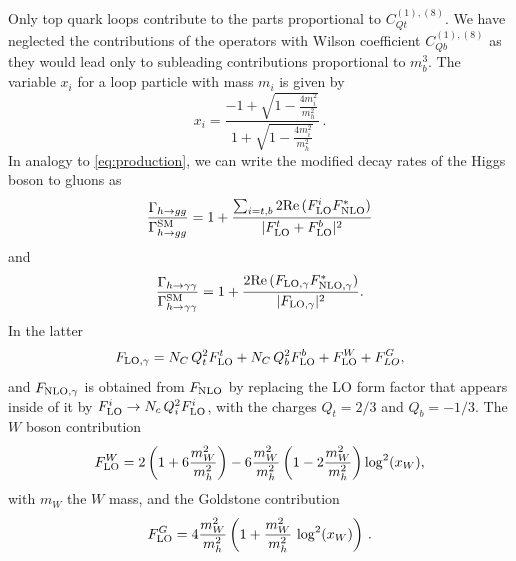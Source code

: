Only top quark loops contribute to the parts proportional to $C_{Qt}^{(1),(8)}$. We have neglected the contributions of the operators with Wilson coefficient $C_{Qb}^{(1),(8)}$ as they would lead only to subleading contributions proportional to $m_b^3$.
%
The variable $x_i$ for a loop particle with mass $m_i$ is given by
\begin{equation}
	x_i=\frac{-1+\sqrt{1-\frac{4 m_i^2}{m_h^2}}}{1+\sqrt{1-\frac{4 m_i^2}{m_h^2}}}\,. \label{eq:xvariable}
\end{equation} 
In analogy to \eqref{eq:production}, we can write the modified decay rates of the Higgs boson to gluons as
\begin{equation}
	\frac{\Gamma_{h\to gg}}{\Gamma_{h\to gg}^{\mathrm{SM}}}= 1+ \frac{ \sum_{i=t,b} 2 \mbox{Re}\,(F_{\textrm{LO}}^i F^*_{\textrm{NLO}})}{ |F_{\textrm{LO}}^t+F_{\textrm{LO}}^b|^2} 
\end{equation}
and 
\begin{equation}
	\frac{\Gamma_{h\to \gamma\gamma}}{\Gamma_{h\to \gamma\gamma}^{\mathrm{SM}}}= 1+ \frac{2 \mbox{Re}\,(F_{\textrm{LO}, \gamma} F^*_{\textrm{NLO},\gamma})}{  |F_{\textrm{LO}, \gamma}|^2} .
\end{equation}
In the latter 
\begin{equation}
	F_{\textrm{LO}, \gamma}= N_C\,Q_t^2 F_{\textrm{LO}}^t+ N_C\,Q_b^2 F_{\textrm{LO}}^b+F_{\textrm{LO}}^W+ F^G_{LO} ,
\end{equation}
and $F_{\textrm{NLO}, \gamma}$ is obtained from $F_{\textrm{NLO}}$ by replacing the LO form factor that appears inside of it by  $ F_{\textrm{LO}}^i \to N_c \,Q_i^2 F_{\textrm{LO}}^i$,
with the charges $Q_t=2/3$ and $Q_b=-1/3$. The $W$ boson contribution
%
\begin{equation}
	F_{\textrm{LO}}^W= 2 \left(1+6 \frac{m_W^2}{m_h^2}\right)-6 \frac{m_W^2}{  m_h^2} \left(1-2  \frac{m_W^2}{m_h^2}\right) \log^2(x_W),
\end{equation}
with $m_W$ the $W$ mass, and the Goldstone contribution
%
\begin{equation}
	F_{\textrm{LO}}^G=4\frac{m_W^2}{m_h^2} \left( 1+ \frac{m_W^2}{m_h^2} \,\log^2(x_W) \right)\,.
\end{equation}
\par

